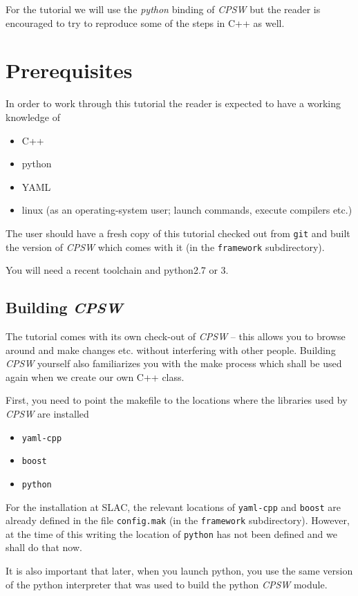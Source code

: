 \documentclass[10pt]{article}
\newcommand{\ita}[1]{\emph{#1}}
\newcommand{\cpsw}      {\ita {CPSW}}
\newcommand{\git}       {{\tt{}git}}
\newcommand{\py}        {python}
\newcommand{\cpp}       {C++}
\newcommand{\cod}[1] {{\tt#1}}
\begin{document}
For the tutorial we will use the {\em \py} binding of \cpsw{} but the reader
is encouraged to try to reproduce some of the steps in \cpp{} as well.

\section{Prerequisites}
In order to work through this tutorial the reader is expected to have a working
knowledge of
\begin{itemize}
  \item \cpp{}
  \item \py
  \item YAML
  \item linux (as an operating-system user; launch commands, execute compilers etc.)
\end{itemize}

The user should have a fresh copy of this tutorial checked out from \git{} and built
the version of \cpsw{} which comes with it (in the \cod{framework} subdirectory).

You will need a recent toolchain and \py{}2.7 or 3.

\subsection{Building \cpsw}
The tutorial comes with its own check-out of \cpsw{} -- this allows you to browse 
around and make changes etc. without interfering with other people. Building \cpsw{}
yourself also familiarizes you with the make process which shall be used again
when we create our own \cpp{} class.

First, you need to point the makefile to the locations where the libraries used by
\cpsw{} are installed
\begin{itemize}
\item \cod{yaml-cpp}
\item \cod{boost}
\item \cod{\py}
\end{itemize}
For the installation at SLAC, the relevant locations of \cod{yaml-cpp} and \cod{boost}
are already defined in the file \cod{config.mak} (in the \cod{framework} subdirectory).
However, at the time of this writing the location of \cod{\py} has not been defined
and we shall do that now.

It is also important that later, when you launch \py{}, you use the same version
of the \py{} interpreter that was used to build the \py{} \cpsw{} module.
\end{document}
